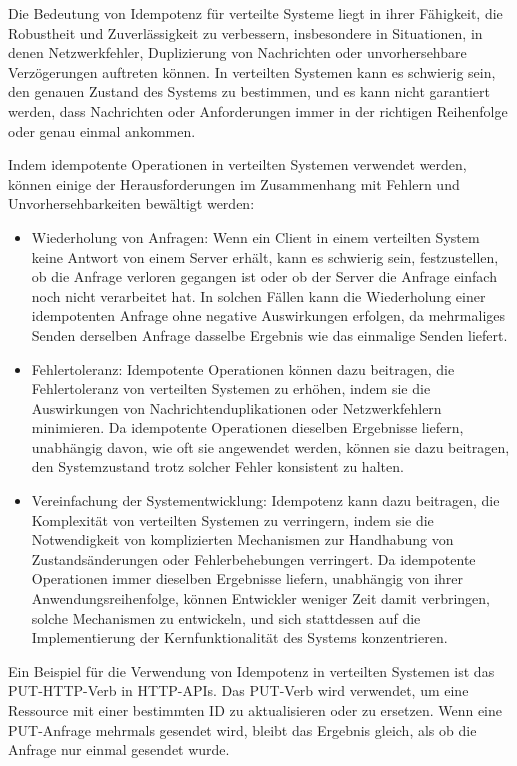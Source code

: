 \documentclass[../vs-script-first-v01.tex]{subfiles}
\begin{document}
Die Bedeutung von Idempotenz für verteilte Systeme liegt in ihrer Fähigkeit, die Robustheit und Zuverlässigkeit zu verbessern, insbesondere in Situationen, in denen Netzwerkfehler, Duplizierung von Nachrichten oder unvorhersehbare Verzögerungen auftreten können. In verteilten Systemen kann es schwierig sein, den genauen Zustand des Systems zu bestimmen, und es kann nicht garantiert werden, dass Nachrichten oder Anforderungen immer in der richtigen Reihenfolge oder genau einmal ankommen.

Indem idempotente Operationen in verteilten Systemen verwendet werden, können einige der Herausforderungen im Zusammenhang mit Fehlern und Unvorhersehbarkeiten bewältigt werden:
\begin{itemize}
\item Wiederholung von Anfragen: Wenn ein Client in einem verteilten System keine Antwort von einem Server erhält, kann es schwierig sein, festzustellen, ob die Anfrage verloren gegangen ist oder ob der Server die Anfrage einfach noch nicht verarbeitet hat. In solchen Fällen kann die Wiederholung einer idempotenten Anfrage ohne negative Auswirkungen erfolgen, da mehrmaliges Senden derselben Anfrage dasselbe Ergebnis wie das einmalige Senden liefert.
\item Fehlertoleranz: Idempotente Operationen können dazu beitragen, die Fehlertoleranz von verteilten Systemen zu erhöhen, indem sie die Auswirkungen von Nachrichtenduplikationen oder Netzwerkfehlern minimieren. Da idempotente Operationen dieselben Ergebnisse liefern, unabhängig davon, wie oft sie angewendet werden, können sie dazu beitragen, den Systemzustand trotz solcher Fehler konsistent zu halten.
\item Vereinfachung der Systementwicklung: Idempotenz kann dazu beitragen, die Komplexität von verteilten Systemen zu verringern, indem sie die Notwendigkeit von komplizierten Mechanismen zur Handhabung von Zustandsänderungen oder Fehlerbehebungen verringert. Da idempotente Operationen immer dieselben Ergebnisse liefern, unabhängig von ihrer Anwendungsreihenfolge, können Entwickler weniger Zeit damit verbringen, solche Mechanismen zu entwickeln, und sich stattdessen auf die Implementierung der Kernfunktionalität des Systems konzentrieren.
\end{itemize}

Ein Beispiel für die Verwendung von Idempotenz in verteilten Systemen ist das PUT-HTTP-Verb in HTTP-APIs. Das PUT-Verb wird verwendet, um eine Ressource mit einer bestimmten ID zu aktualisieren oder zu ersetzen. Wenn eine PUT-Anfrage mehrmals gesendet wird, bleibt das Ergebnis gleich, als ob die Anfrage nur einmal gesendet wurde. 
\end{document}
